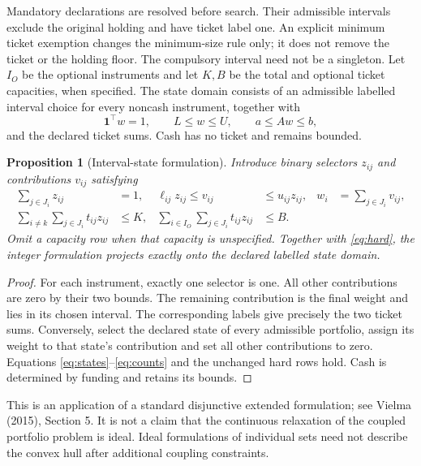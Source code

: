 \documentclass[11pt]{article}
\newtheorem{proposition}{Proposition}
\begin{document}
Mandatory declarations are resolved before search. Their admissible intervals
exclude the original holding and have ticket label one. An explicit minimum
ticket exemption changes the minimum-size rule only; it does not remove the
ticket or the holding floor. The compulsory interval need not be a singleton.
Let $I_O$ be the optional instruments and let $K,B$ be the total and optional
ticket capacities, when specified. The state domain consists of an admissible
labelled interval choice for every noncash instrument, together with
\begin{equation}\label{eq:hard}
 \mathbf 1^\top w=1,\qquad L\le w\le U,\qquad a\le Aw\le b,
\end{equation}
and the declared ticket sums. Cash has no ticket and remains bounded.

\begin{proposition}[Interval-state formulation]
Introduce binary selectors $z_{ij}$ and contributions $v_{ij}$ satisfying
\begin{align}
 \sum_{j\in J_i}z_{ij}&=1,&
 \ell_{ij}z_{ij}\le v_{ij}&\le u_{ij}z_{ij},&
 w_i&=\sum_{j\in J_i}v_{ij},\label{eq:states}\\
 \sum_{i\ne k}\sum_{j\in J_i}t_{ij}z_{ij}&\le K,&
 \sum_{i\in I_O}\sum_{j\in J_i}t_{ij}z_{ij}&\le B.\label{eq:counts}
\end{align}
Omit a capacity row when that capacity is unspecified. Together with
\eqref{eq:hard}, the integer formulation projects exactly onto the declared
labelled state domain.
\end{proposition}
\begin{proof}
For each instrument, exactly one selector is one. All other contributions
are zero by their two bounds. The remaining contribution is the final weight
and lies in its chosen interval. The corresponding labels give precisely
the two ticket sums. Conversely, select the declared state of every admissible
portfolio, assign its weight to that state's contribution and set all other
contributions to zero. Equations \eqref{eq:states}--\eqref{eq:counts} and the
unchanged hard rows hold. Cash is determined by funding and retains its bounds.
\end{proof}

This is an application of a standard disjunctive extended formulation;
see Vielma (2015), Section 5. It is not a claim that the continuous relaxation
of the coupled portfolio problem is ideal. Ideal formulations of individual
sets need not describe the convex hull after additional coupling constraints.
\end{document}

